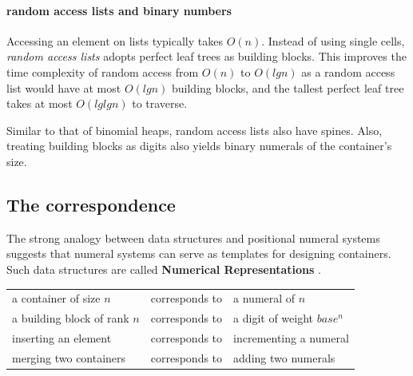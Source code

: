 \documentclass[\main/thesis.tex]{subfiles}
\begin{document}
\paragraph{random access lists and binary numbers}

Accessing an element on lists typically takes $ O(n) $.
Instead of using single cells, \textit{random access lists} adopts perfect
leaf trees as building blocks.
This improves the time complexity of random access from $ O(n) $ to $ O(lg n) $
as a random access list would have at most $ O(lg n) $ building blocks, and
the tallest perfect leaf tree takes at most $ O(lglg n) $ to traverse.

\begin{center}
\end{center}

Similar to that of binomial heaps, random access lists also have spines.
Also, treating building blocks as digits also yields binary numerals of the
container's size.

\subsection{The correspondence}

The strong analogy between data structures and positional numeral systems
suggests that numeral systems can serve as templates for designing containers.
Such data structures are called \textbf{Numerical Representations}\cite{okasaki1996purely}
\cite{hinze1998numerical}.

\begin{center}
    \begin{adjustbox}{max width=\textwidth}
    \begin{tabular}{ l l l }
    a container of size $ n $ & corresponds to & a numeral of $ n $ \\
    a building block of rank $ n $ & corresponds to & a digit of weight $ base^n $ \\
    inserting an element      & corresponds to & incrementing a numeral \\
    merging two containers    & corresponds to & adding two numerals \\
    \end{tabular}
    \end{adjustbox}
\end{center}
\end{document}
